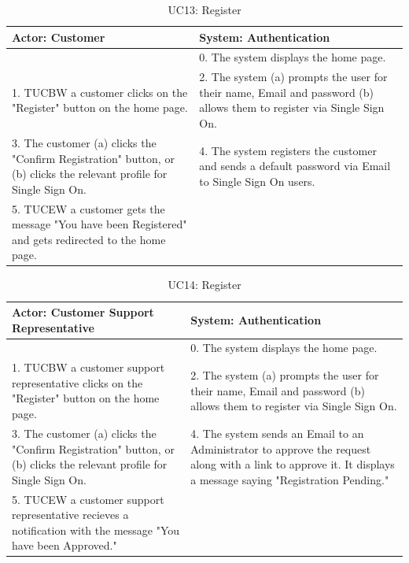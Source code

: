 \documentclass[11pt]{article}
\begin{document}
\begin{table}[H]
	\centering
	\begin{tabular}{|p{8cm}|p{8cm}|}
		\hline
		Actor: Customer & System: Authentication \\
		\hline
		& 0. The system displays the home page. \\
		\hline
		1. TUCBW a customer clicks on the "Register" button on the home page. & 2. The system (a) prompts the user for their name, Email and password (b) allows them to register via Single Sign On.\\
		\hline
		3. The customer (a) clicks the "Confirm Registration" button, or (b) clicks the relevant profile for Single Sign On. & 4. The system registers the customer and sends a default password via Email to Single Sign On users. \\
		\hline
		5. TUCEW a customer gets the message "You have been Registered" and gets redirected to the home page. & \\
		\hline
	\end{tabular}
	\caption{UC13: Register}
\end{table}

\begin{table}[H]
	\centering
	\begin{tabular}{|p{8cm}|p{8cm}|}
		\hline
		Actor: Customer Support Representative & System: Authentication \\
		\hline
		 & 0. The system displays the home page. \\
		\hline
		1. TUCBW a customer support representative clicks on the "Register" button on the home page. & 2. The system (a) prompts the user for their name, Email and password (b) allows them to register via Single Sign On. \\
		\hline
		3. The customer (a) clicks the "Confirm Registration" button, or (b) clicks the relevant profile for Single Sign On. & 4. The system sends an Email to an Administrator to approve the request along with a link to approve it. It displays a message saying "Registration Pending."\\
		\hline
		5. TUCEW a customer support representative recieves a notification with the message "You have been Approved." & \\
		\hline
	\end{tabular}
	\caption{UC14: Register}
\end{table}
\end{document}

